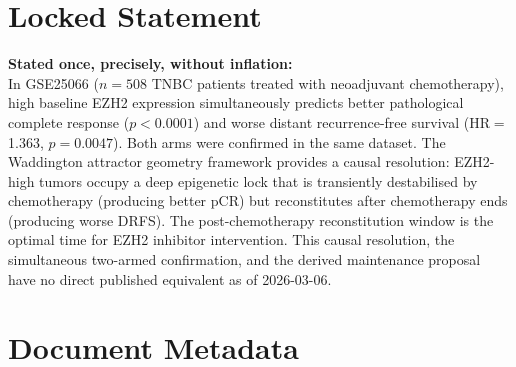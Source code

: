 \documentclass[12pt, a4paper]{article}
\begin{document}
\section{Locked Statement}

\begin{center}
\colorbox{paradoxbox}{
\begin{minipage}{0.88\textwidth}
\vspace{0.6em}
\textbf{Stated once, precisely, without inflation:}
\\[0.5em]
In GSE25066 ($n = 508$ TNBC patients treated with
neoadjuvant chemotherapy), high baseline EZH2
expression simultaneously predicts better
pathological complete response ($p < 0.0001$)
and worse distant recurrence-free survival
(HR$=$1.363, $p = 0.0047$). Both arms were
confirmed in the same dataset. The Waddington
attractor geometry framework provides a causal
resolution: EZH2-high tumors occupy a deep
epigenetic lock that is transiently destabilised
by chemotherapy (producing better pCR) but
reconstitutes after chemotherapy ends (producing
worse DRFS). The post-chemotherapy reconstitution
window is the optimal time for EZH2 inhibitor
intervention. This causal resolution, the
simultaneous two-armed confirmation, and the
derived maintenance proposal have no direct
published equivalent as of 2026-03-06.
\vspace{0.5em}
\end{minipage}}
\end{center}

\section{Document Metadata}
\end{document}
